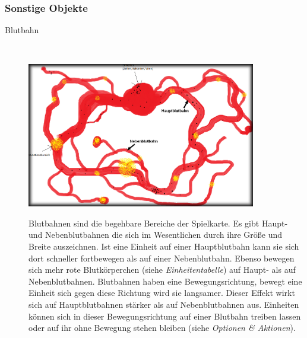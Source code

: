 \documentclass[11pt]{article}
\begin{document}
\subsubsection{Sonstige Objekte}
\begin{description}
\item[Blutbahn]\hfill \\
\begin{center}
\includegraphics[width=10cm]{blutbahn.png}\\
\end{center}
Blutbahnen sind die begehbare Bereiche der Spielkarte. Es gibt Haupt- und Nebenblutbahnen die sich im Wesentlichen durch ihre Gr\"oße und Breite auszeichnen. Ist eine Einheit auf einer Hauptblutbahn kann sie sich dort schneller fortbewegen als auf einer Nebenblutbahn. Ebenso bewegen sich mehr rote Blutk\"orperchen (siehe \textit{Einheitentabelle}) auf Haupt- als auf Nebenblutbahnen. Blutbahnen haben eine Bewegungsrichtung, bewegt eine Einheit sich gegen diese Richtung wird sie langsamer. Dieser Effekt wirkt sich auf Hauptblutbahnen st\"arker als auf Nebenblutbahnen aus. Einheiten k\"onnen sich in dieser Bewegungsrichtung auf einer Blutbahn treiben lassen oder auf ihr ohne Bewegung stehen bleiben (siehe \textit{Optionen \& Aktionen}).


\end{description}
\end{document}

